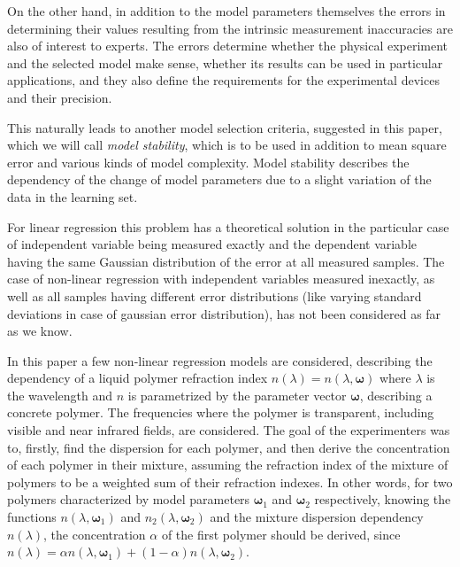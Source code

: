 \documentclass[11pt,a4paper]{article}
\theoremstyle{definition}
\begin{document}
On the other hand, in addition to the model parameters themselves
the errors in determining their values resulting from the intrinsic measurement
inaccuracies are also of interest to experts.
The errors determine whether the physical experiment and the selected model make
sense, whether its results can be used in particular applications, and they also
define the requirements for the experimental devices and their precision.

This naturally leads to another model selection criteria, suggested in this paper,
which we will call \emph{ model stability}, which is to be used
in addition to mean square error and various kinds of model complexity. Model stability
describes the dependency of the change of model parameters due to a slight variation
of the data in the learning set.

For linear regression this problem has a theoretical solution\citep{Vatunin05_en}
in the particular case of independent variable being measured exactly and the
dependent variable having the same Gaussian distribution of the error at all
measured samples. The case of non-linear regression with independent variables
measured inexactly, as well as all samples having
different error distributions (like varying standard deviations in case of gaussian
error distribution), has not been considered as far as we know.

In this paper a few non-linear regression models are considered, describing
the dependency of a liquid polymer refraction index $n(\lambda) = n(\lambda, \boldsymbol{\omega})$
where $\lambda$ is the wavelength and $n$ is parametrized by the parameter
vector $\boldsymbol{\omega}$, describing a concrete polymer.
The frequencies where the polymer is
transparent, including visible and near infrared fields, are considered.
The goal of the experimenters was to, firstly, find the dispersion for each polymer,
and then derive the concentration of each polymer in their mixture, assuming the
refraction index of the mixture of polymers to be a weighted sum of their refraction
indexes. In other words, for two polymers characterized by model parameters
$\boldsymbol{\omega}_1$ and $\boldsymbol{\omega}_2$ respectively, knowing the functions
$n(\lambda, \boldsymbol{\omega}_1)$ and $n_2(\lambda, \boldsymbol{\omega}_2)$
and the mixture dispersion dependency $n(\lambda)$,
the concentration $\alpha$ of the first polymer should be derived, since
$n(\lambda) = \alpha n(\lambda, \boldsymbol{\omega}_1) + (1 - \alpha) n(\lambda, \boldsymbol{\omega}_2)$.
\end{document}
